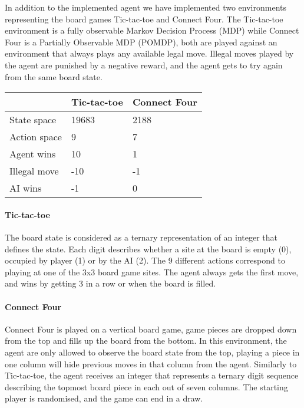 In addition to the implemented agent we have implemented two environments
representing the board games Tic-tac-toe and Connect Four. The Tic-tac-toe
environment is a fully observable Markov Decision Process (MDP) while Connect
Four is a Partially Observable MDP (POMDP), both are played against an
environment that always plays any available legal move. Illegal moves played by
the agent are punished by a negative reward, and the agent gets to try again
from the same board state.

\begin{tabular}{ l | l | l }
                & Tic-tac-toe & Connect Four \\
\hline
  State space 	& 19683 	& 2188 \\
  Action space 	& 9 		& 7 \\
  Agent wins 	& 10 		& 1 \\
  Illegal move 	& -10 	    & -1 \\
  AI wins	 	& -1 		& 0 \\
\end{tabular}

\paragraph{Tic-tac-toe}

The board state is considered as a ternary representation of an integer that
defines the state. Each digit describes whether a site at the board is empty
(0), occupied by player (1) or by the AI (2). The 9 different actions correspond
to playing at one of the 3x3 board game sites. The agent always gets the first
move, and wins by getting 3 in a row or when the board is filled.

\paragraph{Connect Four}

Connect Four is played on a vertical board game, game pieces are dropped down
from the top and fills up the board from the bottom. In this environment, the
agent are only allowed to observe the board state from the top, playing a piece
in one column will hide previous moves in that column from the agent. Similarly
to Tic-tac-toe, the agent receives an integer that represents a ternary digit
sequence describing the topmost board piece in each out of seven columns. The
starting player is randomised, and the game can end in a draw.
